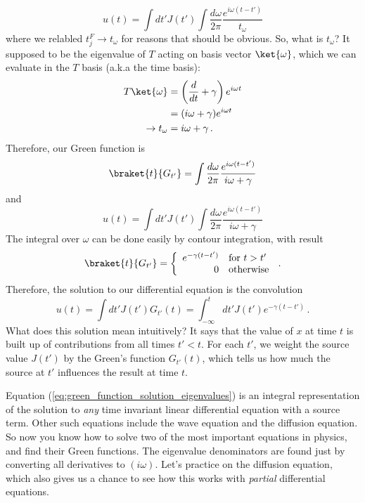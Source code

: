 \begin{equation}
  u(t) = \int dt' J(t') \int \frac{d \omega}{2\pi} \frac{e^{i \omega (t - t')}}{t_\omega}
  \label{eq:green_function_solution_eigenvalues}
\end{equation}
where we relabled $t_j^F \rightarrow t_\omega$ for reasons that should be obvious.
So, what is $t_\omega$?
It supposed to be the eigenvalue of $T$ acting on basis vector $\ket{\omega}$, which we can evaluate in the $T$ basis (a.k.a the time basis):
\begin{align*}
  T \ket{\omega}
  &= \left( \frac{d}{dt} + \gamma \right) e^{i \omega t} \\
  &= ( i \omega + \gamma ) e^{i \omega t} \\
  \rightarrow t_\omega &= i\omega + \gamma
  \, .
\end{align*}
Therefore, our Green function is
\begin{equation*}
  \braket{t}{G_{t'}} = \int \frac{d \omega}{2\pi} \frac{e^{i \omega (t - t')}}{i \omega + \gamma}
\end{equation*}
and
\begin{equation}
  u(t) = \int dt' J(t') \int \frac{d\omega}{2\pi} \frac{e^{i \omega (t - t')}}{i \omega + \gamma}
\end{equation}
The integral over $\omega$ can be done easily by contour integration, with result
\begin{equation}
  \braket{t}{G_{t'}} = \left\{
    \begin{array}{rl}
      e^{-\gamma (t - t')} & \text{for } t > t' \\
      0 & \text{otherwise}
    \end{array}
  \right.
  \, .
\end{equation}
Therefore, the solution to our differential equation is the convolution
\begin{equation}
  u(t) = \int dt' J(t') G_{t'}(t) = \int_{-\infty}^t dt' J(t') e^{-\gamma (t - t')}
  \, .
\end{equation}
What does this solution mean intuitively?
It says that the value of $x$ at time $t$ is built up of contributions from all times $t' < t$.
For each $t'$, we weight the source value $J(t')$ by the Green's function $G_{t'}(t)$, which tells us how much the source at $t'$ influences the result at time $t$.

Equation (\ref{eq:green_function_solution_eigenvalues}) is an integral representation of the solution to \emph{any} time invariant linear differential equation with a source term.
Other such equations include the wave equation and the diffusion equation.
So now you know how to solve two of the most important equations in physics, and find their Green functions.
The eigenvalue denominators are found just by converting all derivatives to $(i \omega)$.
Let's practice on the diffusion equation, which also gives us a chance to see how this works with \emph{partial} differential equations.

